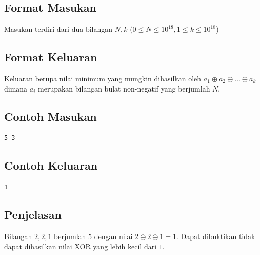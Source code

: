 \documentclass{article}
\begin{document}
\subsection*{Format Masukan}

Masukan terdiri dari dua bilangan  $N, k$ ($0 \leq N \leq 10^{18}, 1 \leq k \leq 10^{18}$)

\subsection*{Format Keluaran}

Keluaran berupa nilai minimum yang mungkin dihasilkan oleh $a_1 \oplus a_2 \oplus \ldots \oplus a_k$ dimana $a_i$ merupakan bilangan bulat non-negatif yang berjumlah $N$.

\begin{multicols}{2}
\subsection*{Contoh Masukan}
\begin{lstlisting}
5 3
\end{lstlisting}
\columnbreak
\subsection*{Contoh Keluaran}
\begin{lstlisting}
1
\end{lstlisting}
\vfill
\null
\end{multicols}

\subsection*{Penjelasan}
Bilangan $2, 2, 1$ berjumlah $5$ dengan nilai $2 \oplus 2 \oplus 1 = 1$. Dapat dibuktikan tidak dapat dihasilkan nilai XOR yang lebih kecil dari $1$.
\pagebreak
\end{document}
